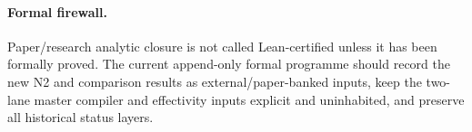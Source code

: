 \documentclass[11pt]{article}
\newcommand{\1}{\mathbf 1}
\begin{document}
\paragraph{Formal firewall.}
Paper/research analytic closure is not called Lean-certified unless it has been formally proved. The current append-only formal programme should record the new N2 and comparison results as external/paper-banked inputs, keep the two-lane master compiler and effectivity inputs explicit and uninhabited, and preserve all historical status layers.
\end{document}
